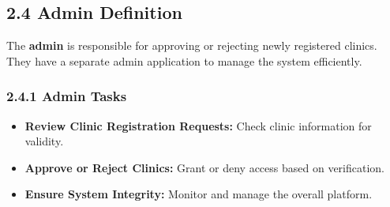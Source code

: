 \documentclass[12pt]{report}
\begin{document}
\vspace{0.5cm}


\subsection*{\textbf{2.4 Admin Definition}}

\noindent The \textbf{admin} is responsible for approving or rejecting newly registered clinics. They have a separate admin application to manage the system efficiently.

\subsubsection*{\textbf{2.4.1 Admin Tasks}}
\begin{itemize}
	\item \textbf{Review Clinic Registration Requests:} Check clinic information for validity.
	\item \textbf{Approve or Reject Clinics:} Grant or deny access based on verification.
	\item \textbf{Ensure System Integrity:} Monitor and manage the overall platform.
\end{itemize}
\end{document}
